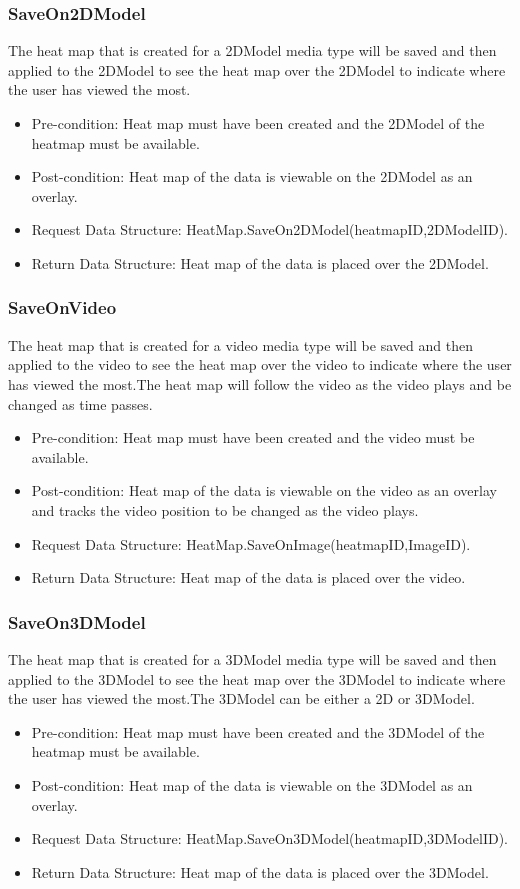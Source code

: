 		\subsubsection{SaveOn2DModel}
The heat map that is created for a 2DModel media type will be saved and then applied to the 2DModel to see the heat map over the 2DModel to indicate where the user has viewed the most.
\begin{itemize}
\item Pre-condition: Heat map must have been created and the 2DModel of the heatmap must be available.
\item Post-condition: Heat map of the data is viewable on the 2DModel as an overlay.
\item Request Data Structure: HeatMap.SaveOn2DModel(heatmapID,2DModelID).
\item Return Data Structure: Heat map of the data is placed over the 2DModel.
\end{itemize}

		\subsubsection{SaveOnVideo}
The heat map that is created for a video media type will be saved and then applied to the video to see the heat map over the video to indicate where the user has viewed the most.The heat map will follow the video as the video plays and be changed as time passes.
\begin{itemize}
\item Pre-condition: Heat map must have been created and the video must be available.
\item Post-condition: Heat map of the data is viewable on the video as an overlay  and tracks the video position to be changed as the video plays.
\item Request Data Structure: HeatMap.SaveOnImage(heatmapID,ImageID).
\item Return Data Structure: Heat map of the data is placed over the video.
\end{itemize}

		\subsubsection{SaveOn3DModel}
The heat map that is created for a 3DModel media type will be saved and then applied to the 3DModel to see the heat map over the 3DModel to indicate where the user has viewed the most.The 3DModel can be either a 2D or 3DModel.
\begin{itemize}
\item Pre-condition: Heat map must have been created and the 3DModel of the heatmap must be available.
\item Post-condition: Heat map of the data is viewable on the 3DModel as an overlay.
\item Request Data Structure: HeatMap.SaveOn3DModel(heatmapID,3DModelID).
\item Return Data Structure: Heat map of the data is placed over the 3DModel.
\end{itemize}
		
